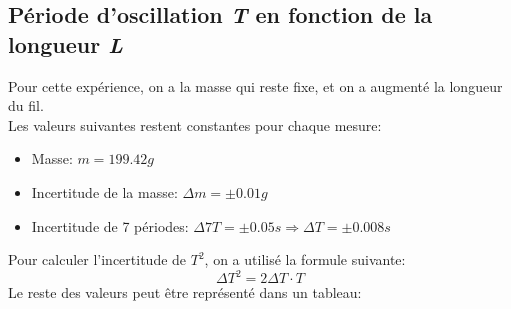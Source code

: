 \documentclass[12pt,a4paper]{article}
\begin{document}
    \subsection{Période d'oscillation \textit{T} en fonction de la longueur \textit{L}}
    Pour cette expérience, on a la masse qui reste fixe, et on a augmenté la longueur du fil. \\
    Les valeurs suivantes restent constantes pour chaque mesure:
    \begin{itemize}
        \item Masse: $m=199.42g$
        \item Incertitude de la masse: $\Delta m=\pm0.01g$
        \item Incertitude de 7 périodes: $\Delta 7T=\pm0.05s\Rightarrow \Delta T=\pm0.008s$
    \end{itemize}
    Pour calculer l'incertitude de $T^2$, on a utilisé la formule suivante:
    \begin{equation*}
        \Delta T^2 = 2 \Delta T\cdot T
    \end{equation*}
    \newpage
    Le reste des valeurs peut être représenté dans un tableau:
\end{document}

